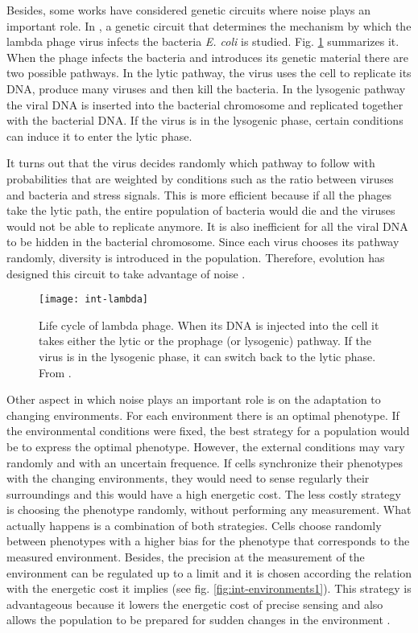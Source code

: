 Besides, some works have considered genetic circuits where noise plays an important role. In \cite{arkin98}, a genetic circuit that determines the mechanism by which the lambda phage virus infects the bacteria \textit{E. coli} is studied. Fig. \ref{fig:int-lambda} summarizes it. When the phage infects the bacteria and introduces its genetic material there are two possible pathways. In the lytic pathway, the virus uses the cell to replicate its DNA, produce many viruses and then kill the bacteria. In the lysogenic pathway the viral DNA is inserted into the bacterial chromosome and replicated together with the bacterial DNA. If the virus is in the lysogenic phase, certain conditions can induce it to enter the lytic phase.

It turns out that the virus decides randomly which pathway to follow with probabilities that are weighted by conditions such as the ratio between viruses and bacteria and stress signals. This is more efficient because if all the phages take the lytic path, the entire population of bacteria would die and the viruses would not be able to replicate anymore. It is also inefficient for all the viral DNA to be hidden in the bacterial chromosome. Since each virus chooses its pathway randomly, diversity is introduced in the population. Therefore, evolution has designed this circuit to take advantage of noise \cite{arkin98}.

\begin{figure}[H]
  \centering
  \texttt{[image: int-lambda]}
  \caption[Life cycle of lambda phage]{\label{fig:int-lambda} Life cycle of lambda phage. When its DNA is injected into the cell it takes either the lytic or the prophage (or lysogenic) pathway. If the virus is in the lysogenic phase, it can switch back to the lytic phase. From \cite{alberts08}.}
\end{figure}

Other aspect in which noise plays an important role is on the adaptation to changing environments. For each environment there is an optimal phenotype. If the environmental conditions were fixed, the best strategy for a population would be to express the optimal phenotype. However, the external conditions may vary randomly and with an uncertain frequence. If cells synchronize their phenotypes with the changing environments, they would need to sense regularly their surroundings and this would have a high energetic cost. The less costly strategy is choosing the phenotype randomly, without performing any measurement. What actually happens is a combination of both strategies. Cells choose randomly between phenotypes with a higher bias for the phenotype that corresponds to the measured environment. Besides, the precision at the measurement of the environment can be regulated up to a limit and it is chosen according the relation with the energetic cost it implies (see fig. \ref{fig:int-environments1}). This strategy is advantageous because it lowers the energetic cost of precise sensing and also allows the population to be prepared for sudden changes in the environment \cite{kussell05}.

